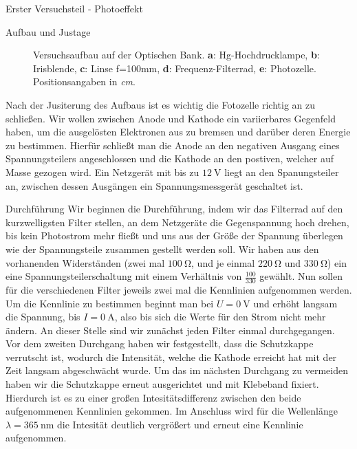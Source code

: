 \documentclass[pdftex, a4paper,11pt, twoside, ngerman]{report}
\begin{document}
\begin{chapter}{Erster Versuchsteil - Photoeffekt}
\begin{section}{Aufbau und Justage}
\begin{figure}[htbp]
\begin{center}
          \caption{Versuchsaufbau auf der Optischen Bank. \textbf{a}:
              Hg-Hochdrucklampe, \textbf{b}: Irisblende,  \textbf{c}: Linse
              f=100mm, \textbf{d}: Frequenz-Filterrad, \textbf{e}: Photozelle.
              Positionsangaben in \textit{cm}. \cite{bib:LDDidactic}}
          \label{fig:Planckaufbau}
        \end{center}
      \end{figure}
      Nach der Jusiterung des Aufbaus ist es wichtig die Fotozelle richtig an
      zu schließen. Wir wollen zwischen Anode und Kathode ein variierbares
      Gegenfeld haben, um die ausgelösten Elektronen aus zu bremsen und darüber
      deren Energie zu bestimmen. Hierfür schließt man die Anode an den
      negativen Ausgang eines Spannungsteilers angeschlossen und die Kathode
      an den postiven, welcher auf Masse gezogen wird. Ein Netzgerät mit bis
      zu $\SI{12}{\volt}$ liegt an den Spanungsteiler an, zwischen dessen
      Ausgängen ein Spannungsmessgerät geschaltet ist.
     
    \end{section}
   
   
   
    \begin{section}{Durchführung}
      \label{chp:Aufbau:sec:ERSTERTEIL:subsec:UNTERTEIL}
      Wir beginnen die Durchführung, indem wir das Filterrad auf den
      kurzwelligsten Filter stellen, an dem Netzgeräte die Gegenspannung hoch
      drehen, bis kein Photostrom mehr fließt und uns aus der Größe der
      Spannung überlegen wie der Spannungsteile zusammen gestellt werden soll.
      Wir haben aus den vorhanenden Widerständen (zwei mal $\SI{100}{\ohm}$,
      und je einmal $\SI{220}{\ohm}$ und $\SI{330}{\ohm}$) ein eine
      Spannungsteilerschaltung mit einem Verhältnis von $\frac{100}{330}$
      gewählt. Nun sollen für die verschiedenen Filter jeweils zwei mal die
      Kennlinien aufgenommen werden.
      Um die Kennlinie zu bestimmen beginnt man bei $U=\SI{0}{\volt}$ und
      erhöht langsam die Spannung, bis $I=\SI{0}{\ampere}$, also bis sich die
      Werte für den Strom nicht mehr ändern. An dieser Stelle sind wir
      zunächst jeden Filter einmal durchgegangen. Vor dem zweiten Durchgang
      haben wir festgestellt, dass die Schutzkappe verrutscht ist, wodurch die
      Intensität, welche die Kathode erreicht hat mit der Zeit langsam
      abgeschwächt wurde. Um das im nächsten Durchgang zu vermeiden haben wir
      die Schutzkappe erneut ausgerichtet und mit Klebeband fixiert. Hierdurch
      ist es zu einer großen Intesitätsdifferenz zwischen den beide
      aufgenommenen Kennlinien gekommen. Im Anschluss wird für die Wellenlänge
      $\lambda = \SI{365}{\nano\meter}$ die Intesität deutlich vergrößert und
      erneut eine Kennlinie aufgenommen. 


\end{section}
\end{chapter}
\end{document}
